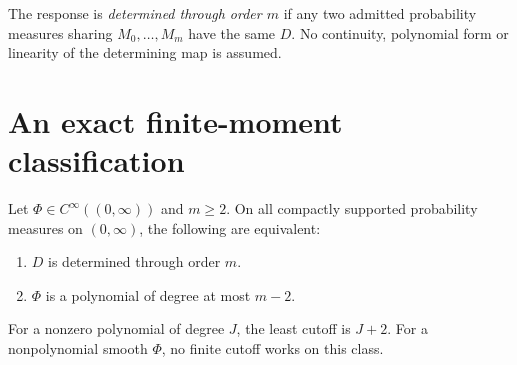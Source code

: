 \documentclass[11pt]{article}
\begin{document}
\begin{definition}
The response is \emph{determined through order $m$} if any two admitted
probability measures sharing $M_0,\ldots,M_m$ have the same $D$.
No continuity, polynomial form or linearity of the determining map is assumed.
\end{definition}

\section{An exact finite-moment classification}
\begin{theorem}\label{thm:classification}
Let $\Phi\in C^\infty((0,\infty))$ and $m\geq2$.
On all compactly supported probability measures on $(0,\infty)$,
the following are equivalent:
\begin{enumerate}[label=(\roman*)]
\item $D$ is determined through order $m$.
\item $\Phi$ is a polynomial of degree at most $m-2$.
\end{enumerate}
For a nonzero polynomial of degree $J$, the least cutoff is $J+2$.
For a nonpolynomial smooth $\Phi$, no finite cutoff works on this class.
\end{theorem}
\end{document}
